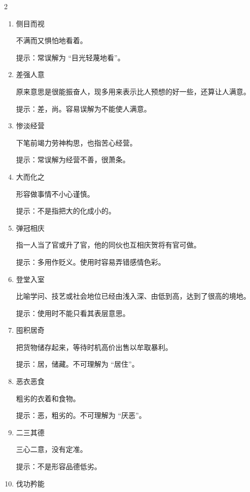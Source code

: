 \documentclass[final,oneside]{ctexbook}
\begin{document}
\begin{multicols}{2}
\begin{enumerate}
      提示：足，值得；训，准则、典范。并非是不值得作为教训。

    \item 侧目而视

      不满而又惧怕地看着。

      提示：常误解为 “目光轻蔑地看”。

    \item 差强人意

      原来意思是很能振奋人，现多用来表示比人预想的好一些，还算让人满意。

      提示：差，尚。容易误解为不能使人满意。

    \item 惨淡经营

      下笔前竭力劳神构思，也指苦心经营。

      提示：常误解为经营不善，很萧条。

    \item 大而化之

      形容做事情不小心谨慎。

      提示：不是指把大的化成小的。

    \item 弹冠相庆

      指一人当了官或升了官，他的同伙也互相庆贺将有官可做。

      提示：多用作贬义。使用时容易弄错感情色彩。

    \item 登堂入室

      比喻学问、技艺或社会地位已经由浅入深、由低到高，达到了很高的境地。

      提示：使用时不能只看其表层意思。

    \item 囤积居奇

      把货物储存起来，等待时机高价出售以牟取暴利。

      提示：居，储藏。不可理解为 “居住”。

    \item 恶衣恶食

      粗劣的衣着和食物。

      提示：恶，粗劣的。不可理解为 “厌恶”。

    \item 二三其德

      三心二意，没有定准。

      提示：不是形容品德低劣。

    \item 伐功矜能


\end{enumerate}
\end{multicols}
\end{document}
